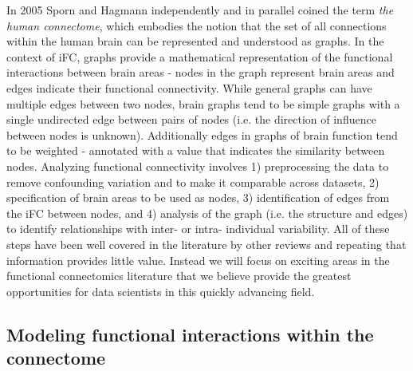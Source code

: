 In 2005 Sporn and Hagmann \cite{Sporns2005,Hagmann2005} independently and in parallel coined the term \textit{the human connectome}, which embodies the notion that the set of all connections within the human brain can be represented and understood as graphs. In the context of iFC, graphs provide a mathematical representation of the functional interactions between brain areas -  nodes in the graph represent brain areas and edges indicate their functional connectivity. While general graphs can have multiple edges between two nodes, brain graphs tend to be simple graphs with a single undirected edge between pairs of nodes (i.e. the direction of influence between nodes is unknown). Additionally edges in graphs of brain function tend to be weighted - annotated with a value that indicates the similarity between nodes. Analyzing functional connectivity involves 1) preprocessing the data to remove confounding variation and to make it comparable across datasets, 2) specification of brain areas to be used as nodes, 3) identification of edges from the iFC between nodes, and 4) analysis of the graph (i.e. the structure and edges) to identify relationships with inter- or intra- individual variability. All of these steps have been well covered in the literature by other reviews \cite{Craddock2013,Kelly2012,Varoquaux2013} and repeating that information provides little value. Instead we will focus on exciting areas in the functional connectomics literature that we believe provide the greatest opportunities for data scientists in this quickly advancing field.

\subsection{Modeling functional interactions within the connectome}

